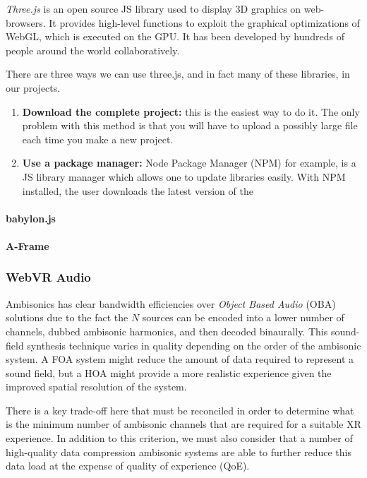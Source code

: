 \textit{Three.js} is an open source JS library used to display 3D graphics on web-browsers. It provides high-level functions to exploit the graphical optimizations of WebGL, which is executed on the GPU. It has been developed by hundreds of people around the world collaboratively. 

There are three ways we can use three.js, and in fact many of these libraries, in our projects. 

\begin{enumerate}
    \item \textbf{Download the complete project:} this is the easiest way to do it. The only problem with this method is that you will have to upload a possibly large file each time you make a new project. 
    
    \item \textbf{Use a package manager:} Node Package Manager (NPM) for example, is a JS library manager which allows one to update libraries easily. With NPM installed, the user downloads the latest version of the 
\end{enumerate}


\paragraph{babylon.js}

\paragraph{A-Frame}






\subsubsection{WebVR Audio}

Ambisonics has clear bandwidth efficiencies over \textit{Object Based Audio} (OBA) solutions due to the fact the $N$ sources can be encoded into a lower number of channels, dubbed ambisonic harmonics, and then decoded binaurally. This sound-field synthesis technique varies in quality depending on the order of the ambisonic system. A FOA system might reduce the amount of data required to represent a sound field, but a HOA might provide a more realistic experience given the improved spatial resolution of the system.

There is a key trade-off here that must be reconciled in order to determine what is the minimum number of ambisonic channels that are required for a suitable XR experience. In addition to this criterion, we must also consider that a number of high-quality data compression ambisonic systems are able to further reduce this data load at the expense of quality of experience (QoE). 


